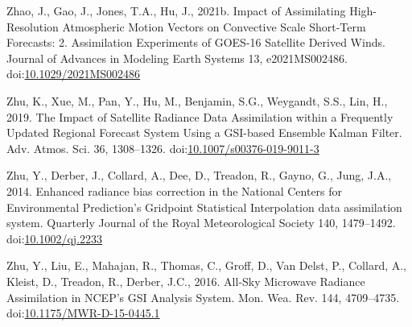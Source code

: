\documentclass[final,5p,times,twocolumn,authoryear]{elsarticle} %
\begin{document}
\leavevmode\hypertarget{ref-zhao2021a}{}%
Zhao, J., Gao, J., Jones, T.A., Hu, J., 2021b. Impact of Assimilating High-Resolution Atmospheric Motion Vectors on Convective Scale Short-Term Forecasts: 2. Assimilation Experiments of GOES-16 Satellite Derived Winds. Journal of Advances in Modeling Earth Systems 13, e2021MS002486. doi:\href{https://doi.org/10.1029/2021MS002486}{10.1029/2021MS002486}

\leavevmode\hypertarget{ref-zhu2019}{}%
Zhu, K., Xue, M., Pan, Y., Hu, M., Benjamin, S.G., Weygandt, S.S., Lin, H., 2019. The Impact of Satellite Radiance Data Assimilation within a Frequently Updated Regional Forecast System Using a GSI-based Ensemble Kalman Filter. Adv. Atmos. Sci. 36, 1308--1326. doi:\href{https://doi.org/10.1007/s00376-019-9011-3}{10.1007/s00376-019-9011-3}

\leavevmode\hypertarget{ref-zhu2014}{}%
Zhu, Y., Derber, J., Collard, A., Dee, D., Treadon, R., Gayno, G., Jung, J.A., 2014. Enhanced radiance bias correction in the National Centers for Environmental Prediction's Gridpoint Statistical Interpolation data assimilation system. Quarterly Journal of the Royal Meteorological Society 140, 1479--1492. doi:\href{https://doi.org/10.1002/qj.2233}{10.1002/qj.2233}

\leavevmode\hypertarget{ref-zhu2016}{}%
Zhu, Y., Liu, E., Mahajan, R., Thomas, C., Groff, D., Van Delst, P., Collard, A., Kleist, D., Treadon, R., Derber, J.C., 2016. All-Sky Microwave Radiance Assimilation in NCEP's GSI Analysis System. Mon. Wea. Rev. 144, 4709--4735. doi:\href{https://doi.org/10.1175/MWR-D-15-0445.1}{10.1175/MWR-D-15-0445.1}
\end{document}
